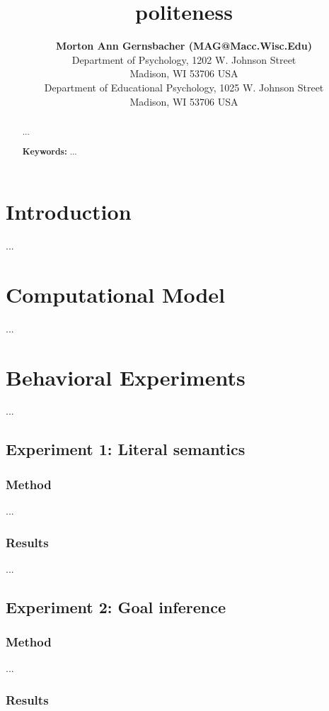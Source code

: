 \documentclass[10pt,letterpaper]{article}
\title{politeness}
\author{{\large \bf Morton Ann Gernsbacher (MAG@Macc.Wisc.Edu)} \\
  Department of Psychology, 1202 W. Johnson Street \\
  Madison, WI 53706 USA
  \AND {\large \bf Sharon J.~Derry (SDJ@Macc.Wisc.Edu)} \\
  Department of Educational Psychology, 1025 W. Johnson Street \\
  Madison, WI 53706 USA}
\begin{document}
\maketitle


\begin{abstract}

...

\textbf{Keywords:} 
...
\end{abstract}


\section{Introduction}

...

\section{Computational Model}

...

\section{Behavioral Experiments}

...

\subsection{Experiment 1: Literal semantics}

\subsubsection{Method}

...

\subsubsection{Results}

...

\subsection{Experiment 2: Goal inference}

\subsubsection{Method}

...

\subsubsection{Results}
\end{document}
